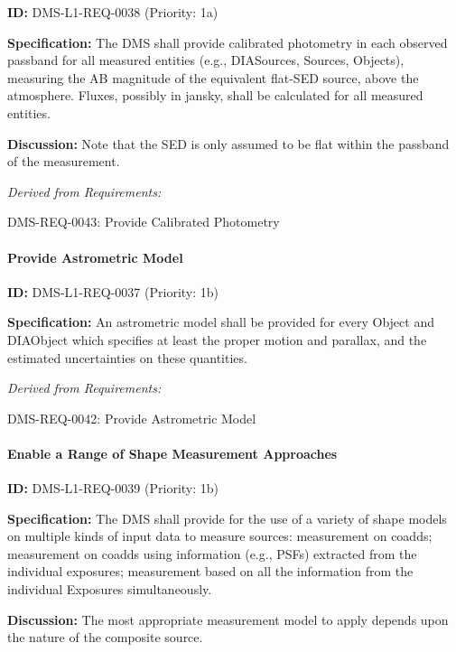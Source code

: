 \documentclass[SE,toc,lsstdraft]{lsstdoc}
\begin{document}
\label{DMS-L1-REQ-0038}
\textbf{ID:} DMS-L1-REQ-0038 (Priority: 1a)

\textbf{Specification:} The DMS shall provide calibrated photometry in each observed passband for all measured entities (e.g., DIASources, Sources, Objects), measuring the AB magnitude of the equivalent flat-SED source, above the atmosphere. Fluxes, possibly in jansky, shall be calculated for all measured entities.

\textbf{Discussion: }Note that the SED is only assumed to be flat within the passband of the measurement.

\emph{Derived from Requirements:}

DMS-REQ-0043:
Provide Calibrated Photometry \newline

\paragraph{Provide Astrometric Model}\hfill  %

\label{DMS-L1-REQ-0037}
\textbf{ID:} DMS-L1-REQ-0037 (Priority: 1b)

\textbf{Specification:} An astrometric model shall be provided for every Object and DIAObject which specifies at least the proper motion and parallax, and the estimated uncertainties on these quantities.

\emph{Derived from Requirements:}

DMS-REQ-0042:
Provide Astrometric Model \newline

\paragraph{Enable a Range of Shape Measurement Approaches}\hfill  %

\label{DMS-L1-REQ-0039}
\textbf{ID:} DMS-L1-REQ-0039 (Priority: 1b)

\textbf{Specification:} The DMS shall provide for the use of a variety of shape models on multiple kinds of input data to measure sources: measurement on coadds; measurement on coadds using information (e.g., PSFs) extracted from the individual exposures; measurement based on all the information from the individual Exposures simultaneously.

\textbf{Discussion: }The most appropriate measurement model to apply depends upon the nature of the composite source.
\end{document}
